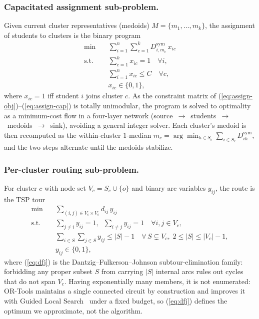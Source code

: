 \documentclass[runningheads]{llncs}
\begin{document}
\subsubsection{Capacitated assignment sub-problem.}
Given current cluster representatives (medoids)
$M=\{m_1,\dots,m_k\}$, the assignment of students to clusters is the
binary program
\begin{align}
\min \quad & \sum_{i=1}^{n}\sum_{c=1}^{k} D^{\mathrm{sym}}_{i,m_c}\,x_{ic}
\label{eq:assign-obj}\\
\text{s.t.}\quad & \sum_{c=1}^{k} x_{ic}=1 \quad \forall i, \label{eq:assign-cover}\\
& \sum_{i=1}^{n} x_{ic}\le C \quad \forall c, \label{eq:assign-cap}\\
& x_{ic}\in\{0,1\},
\end{align}
where $x_{ic}=1$ iff student $i$ joins cluster $c$. As the constraint
matrix of (\ref{eq:assign-obj})--(\ref{eq:assign-cap}) is totally
unimodular, the program is solved to optimality as a minimum-cost flow
in a four-layer network (source~$\to$~students~$\to$~medoids~$\to$~sink),
avoiding a general integer solver. Each cluster's medoid is then
recomputed as the within-cluster $1$-median
$m_c=\arg\min_{h\in S_c}\sum_{i\in S_c} D^{\mathrm{sym}}_{ih}$, and the
two steps alternate until the medoids stabilize.

\subsubsection{Per-cluster routing sub-problem.}
For cluster $c$ with node set $V_c=S_c\cup\{o\}$ and binary arc
variables $y_{ij}$, the route is the TSP tour
\begin{align}
\min \quad & \sum_{(i,j)\in V_c\times V_c} d_{ij}\,y_{ij}\\
\text{s.t.}\quad & \textstyle\sum_{j\neq i} y_{ij}=1,\;\;
\sum_{i\neq j} y_{ij}=1 \quad \forall i,j\in V_c,\\
& \textstyle\sum_{i\in S}\sum_{j\in S} y_{ij}\le |S|-1
  \quad \forall\, S\subsetneq V_c,\; 2\le|S|\le|V_c|-1,
  \label{eq:dfj}\\
& y_{ij}\in\{0,1\},
\end{align}
where (\ref{eq:dfj}) is the Dantzig--Fulkerson--Johnson
subtour-elimination family: forbidding any proper subset $S$ from
carrying $|S|$ internal arcs rules out cycles that do not span $V_c$.
Having exponentially many members, it is not enumerated: OR-Tools
maintains a single connected circuit by construction and improves it
with Guided Local Search~\cite{Voudouris1999GLS} under a fixed budget,
so (\ref{eq:dfj}) defines the optimum we approximate, not the algorithm.
\end{document}
